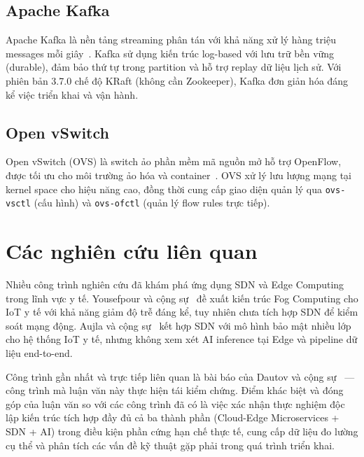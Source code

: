 \subsection{Apache Kafka}

Apache Kafka là nền tảng streaming phân tán với khả năng xử lý hàng triệu messages mỗi giây~\cite{kreps2011kafka}. Kafka sử dụng kiến trúc log-based với lưu trữ bền vững (durable), đảm bảo thứ tự trong partition và hỗ trợ replay dữ liệu lịch sử. Với phiên bản 3.7.0 chế độ KRaft (không cần Zookeeper), Kafka đơn giản hóa đáng kể việc triển khai và vận hành.

\subsection{Open vSwitch}

Open vSwitch (OVS) là switch ảo phần mềm mã nguồn mở hỗ trợ OpenFlow, được tối ưu cho môi trường ảo hóa và container~\cite{pfaff2015ovs}. OVS xử lý lưu lượng mạng tại kernel space cho hiệu năng cao, đồng thời cung cấp giao diện quản lý qua \texttt{ovs-vsctl} (cấu hình) và \texttt{ovs-ofctl} (quản lý flow rules trực tiếp).

\section{Các nghiên cứu liên quan}

Nhiều công trình nghiên cứu đã khám phá ứng dụng SDN và Edge Computing trong lĩnh vực y tế. Yousefpour và cộng sự~\cite{yousefpour2019fog} đề xuất kiến trúc Fog Computing cho IoT y tế với khả năng giảm độ trễ đáng kể, tuy nhiên chưa tích hợp SDN để kiểm soát mạng động. Aujla và cộng sự~\cite{aujla2020sdn} kết hợp SDN với mô hình bảo mật nhiều lớp cho hệ thống IoT y tế, nhưng không xem xét AI inference tại Edge và pipeline dữ liệu end-to-end.

Công trình gần nhất và trực tiếp liên quan là bài báo của Dautov và cộng sự~\cite{paper_main} — công trình mà luận văn này thực hiện tái kiểm chứng. Điểm khác biệt và đóng góp của luận văn so với các công trình đã có là việc xác nhận thực nghiệm độc lập kiến trúc tích hợp đầy đủ cả ba thành phần (Cloud-Edge Microservices + SDN + AI) trong điều kiện phần cứng hạn chế thực tế, cung cấp dữ liệu đo lường cụ thể và phân tích các vấn đề kỹ thuật gặp phải trong quá trình triển khai.
